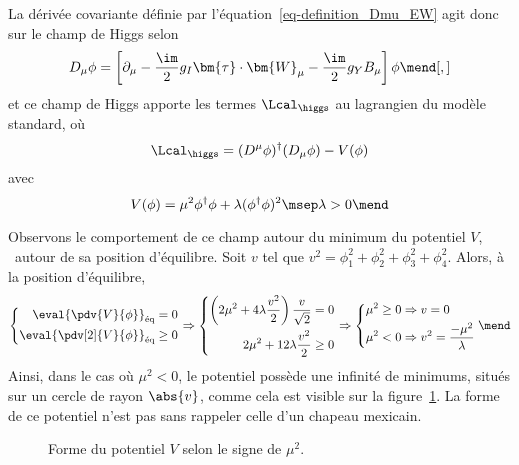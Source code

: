 \par La dérivée covariante définie par l'équation~\eqref{eq-definition_Dmu_EW} agit donc sur le champ de Higgs selon
\begin{equation}
D_\mu \phi = \left[ \partial_\mu - \frac{\im}{2}g_I \bm{\tau}\cdot\bm{W}_\mu - \frac{\im}{2}g_YB_\mu \right] \phi
\mend[,]
\end{equation}
et ce champ de Higgs apporte les termes $\Lcal_{\higgs}$ au lagrangien du modèle standard, où
\begin{equation}
\Lcal_{\higgs} = (D^\mu\phi)^\dagger(D_\mu\phi) - V(\phi)
\end{equation}
avec
\begin{equation}
V(\phi)
= \mu^2\phi^\dagger\phi + \lambda (\phi^\dagger\phi)^2
\msep \lambda > 0
\mend
\label{eq-chapter-MS-MSSM-section-formalisme-subsec-Higgs_mechanism-SM_Higgs_potential}
\end{equation}
\par Observons le comportement de ce champ autour du minimum du potentiel $V$, \ie\ autour de sa position d'équilibre.
Soit $v$ tel que $v^2=\phi_1^2+\phi_2^2+\phi_3^2+\phi_4^2$.
Alors, à la position d'équilibre,
\begin{equation}
\left\lbrace
\begin{aligned}
\eval{\pdv{V}{\phi}}_\text{éq}=0
\\
\eval{\pdv[2]{V}{\phi}}_\text{éq}\geq0
\end{aligned}
\right.
\Rightarrow
\left\lbrace
\begin{aligned}
\left(2\mu^2 + 4\lambda \frac{v^2}{2}\right) \frac{v}{\sqrt{2}} = 0
\\
2\mu^2 + 12\lambda \frac{v^2}{2} \geq0
\end{aligned}
\right.
\Rightarrow
\left\lbrace
\begin{aligned}
\mu^2 \geq 0 &\Rightarrow v = 0
\\
\mu^2 < 0 &\Rightarrow v^2 = \frac{-\mu^2}{\lambda}
\end{aligned}
\right.
\mend
\end{equation}
Ainsi, dans le cas où $\mu^2<0$, le potentiel possède une infinité de minimums, situés sur un cercle de rayon $\abs{v}$, comme cela est visible sur la figure~\ref{fig-rpztation_3d_V_Higgs}. La forme de ce potentiel n'est pas sans rappeler celle d'un chapeau mexicain.
\begin{figure}[h]
\centering

\caption{Forme du potentiel $V$ selon le signe de $\mu^2$.}
\label{fig-rpztation_3d_V_Higgs}
\end{figure}
